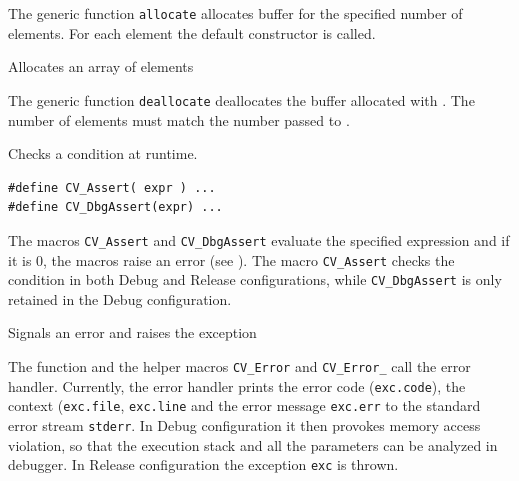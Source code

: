 The generic function \texttt{allocate} allocates buffer for the specified number of elements. For each element the default constructor is called.


Allocates an array of elements

\begin{description}
\end{description}

The generic function \texttt{deallocate} deallocates the buffer allocated with . The number of elements must match the number passed to .

\label{CV Assert}
Checks a condition at runtime.


\begin{lstlisting}
#define CV_Assert( expr ) ...
#define CV_DbgAssert(expr) ...
\end{lstlisting}

\begin{description}
\end{description}

The macros \texttt{CV\_Assert} and \texttt{CV\_DbgAssert} evaluate the specified expression and if it is 0, the macros raise an error (see ). The macro \texttt{CV\_Assert} checks the condition in both Debug and Release configurations, while \texttt{CV\_DbgAssert} is only retained in the Debug configuration.

Signals an error and raises the exception

\begin{description}
\end{description}

The function and the helper macros \texttt{CV\_Error} and \texttt{CV\_Error\_} call the error handler. Currently, the error handler prints the error code (\texttt{exc.code}), the context (\texttt{exc.file}, \texttt{exc.line} and the error message \texttt{exc.err} to the standard error stream \texttt{stderr}. In Debug configuration it then provokes memory access violation, so that the execution stack and all the parameters can be analyzed in debugger. In Release configuration the exception \texttt{exc} is thrown.

